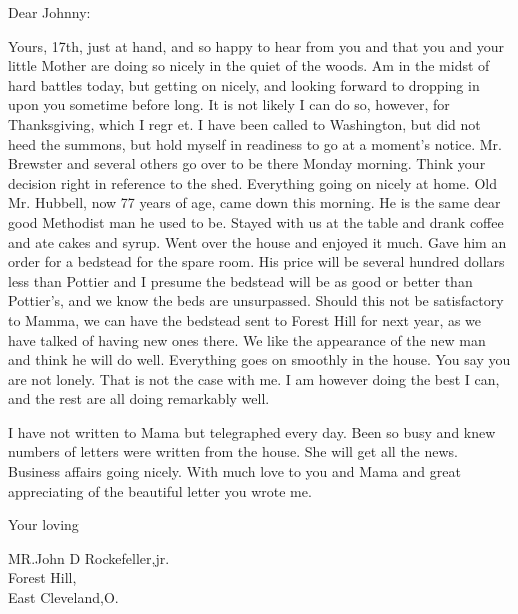 \documentclass[11pt, oneside]{letter}   	%
\date{November 19, 1887}
\begin{document}
\begin{letter}{}%

\opening{Dear Johnny:}
\setlength{\parindent}{0.5cm}

Yours, 17th, just at hand, and so happy to hear from you and that you and your little Mother are doing so nicely in the quiet of the woods. Am in the midst of hard battles today, but getting on nicely, and looking forward to dropping in upon you sometime before long. It is not likely I can do so, however, for Thanksgiving, which I regr et. I have been called to Washington, but did not heed the summons, but hold myself in readiness to go at a moment's notice. Mr. Brewster and several others go over to be there Monday morning. Think your decision right in reference to the shed. Everything going on nicely at home. Old Mr. Hubbell, now 77 years of age, came down this morning. He is the same dear good Methodist man he used to be. Stayed with us at the table and drank coffee and ate cakes and syrup. Went over the house and enjoyed it much. Gave him an order for a bedstead for the spare room. His price will be several hundred dollars less than Pottier and I presume the bedstead will be as good or better than Pottier's, and we know the beds are unsurpassed. Should this not be satisfactory to Mamma, we can have the bedstead sent to Forest Hill for next year, as we have talked of having new ones there. We like the appearance of the new man and think he will do well. Everything goes on smoothly in the house. You say you are not lonely. That is not the case with me. I am however doing the best I can, and the rest are all doing remarkably well.

I have not written to Mama but telegraphed every day. Been so busy and knew numbers of letters were written from the house. She will get all the news. Business affairs going nicely. With much love to you and Mama and great appreciating of the beautiful letter you wrote me.

\closing{Your loving}


\setlength{\parindent}{0cm}

\opening{MR.John D Rockefeller,jr.\\Forest Hill,\\East Cleveland,O.}


\end{letter}
\end{document}
